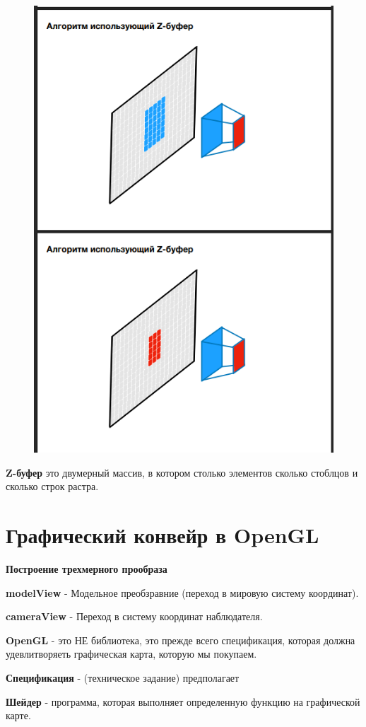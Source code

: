 \documentclass{article}
\begin{document}
\begin{figure} [H]
    \includegraphics[width=0.70\linewidth]{Снимок экрана 2025-05-05 124350.png}
\end{figure}


\textbf{Z-буфер} это двумерный массив, 
в котором столько элементов сколько стоблцов и сколько строк растра.


\section{Графический конвейр в OpenGL}


\textbf{Построение трехмерного прообраза}

\textbf{modelView} - Модельное преобзравние (переход в мировую систему координат).

\textbf{cameraView} - Переход в систему координат наблюдателя.

\textbf{OpenGL} - это НЕ библиотека, это прежде всего спецификация, которая должна
удевлитворяеть графическая карта, которую мы покупаем.

\textbf{Спецификация} - (техническое задание) предполагает


\textbf{Шейдер} - программа, 
которая выполняет определенную функцию на графической карте.
\end{document}
